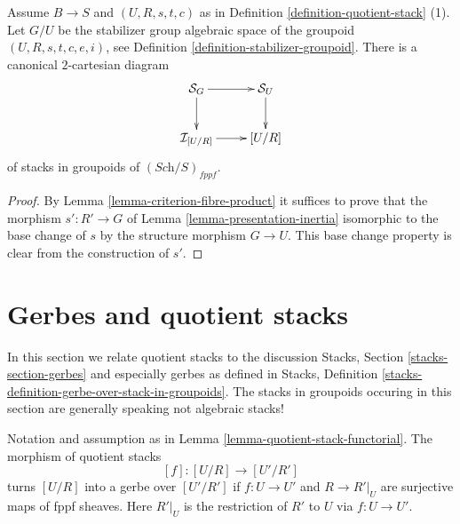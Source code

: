 \begin{lemma}
\label{lemma-2-cartesian-inertia}
Assume $B \to S$ and $(U, R, s, t, c)$ as in
Definition \ref{definition-quotient-stack} (1).
Let $G/U$ be the stabilizer group algebraic space of the groupoid
$(U, R, s, t, c, e, i)$, see
Definition \ref{definition-stabilizer-groupoid}.
There is a canonical $2$-cartesian diagram
$$
\xymatrix{
\mathcal{S}_G \ar[r] \ar[d] & \mathcal{S}_U \ar[d] \\
\mathcal{I}_{[U/R]} \ar[r] & [U/R]
}
$$
of stacks in groupoids of $(\textit{Sch}/S)_{fppf}$.
\end{lemma}

\begin{proof}
By
Lemma \ref{lemma-criterion-fibre-product}
it suffices to prove that the morphism
$s' : R' \to G$ of
Lemma \ref{lemma-presentation-inertia}
isomorphic to the base change of $s$ by the structure
morphism $G \to U$. This base change property is
clear from the construction of $s'$.
\end{proof}







\section{Gerbes and quotient stacks}
\label{section-gerbes}

\noindent
In this section we relate quotient stacks to the discussion
Stacks, Section \ref{stacks-section-gerbes}
and especially gerbes as defined in
Stacks, Definition \ref{stacks-definition-gerbe-over-stack-in-groupoids}.
The stacks in groupoids occuring in this section
are generally speaking not algebraic stacks!

\begin{lemma}
\label{lemma-when-gerbe}
Notation and assumption as in
Lemma \ref{lemma-quotient-stack-functorial}.
The morphism of quotient stacks
$$
[f] : [U/R] \longrightarrow [U'/R']
$$
turns $[U/R]$ into a gerbe over $[U'/R']$ if $f : U \to U'$ and
$R \to R'|_U$ are surjective maps of fppf sheaves. Here $R'|_U$ is
the restriction of $R'$ to $U$ via $f : U \to U'$.
\end{lemma}


